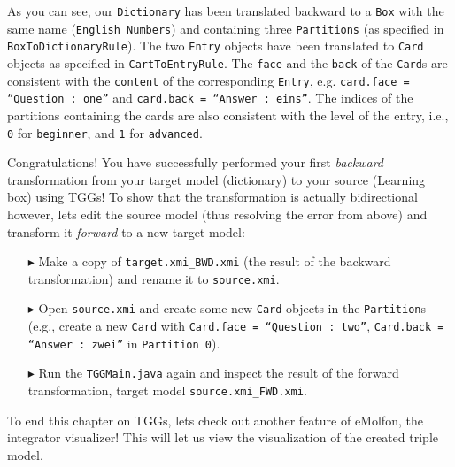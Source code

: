 As you can see, our \texttt{Dictionary} has been translated backward to a \texttt{Box} with the same name (\texttt{English Numbers}) and containing three
\texttt{Par\-ti\-tions} (as specified in \texttt{Box\-To\-Dictionary\-Rule}). The two \texttt{Entry} objects have been translated to \texttt{Card} objects as
specified in \texttt{CartToEntryRule}. The \texttt{face} and the \texttt{back} of the \texttt{Card}s are consistent with the \texttt{content}
of the corresponding \texttt{Entry}, e.g. \texttt{card.face = ``Question : one''} and \texttt{card.back = ``Answer : eins''}. The indices of the partitions
containing the cards are also consistent with the level of the entry, i.e., \texttt{0} for \texttt{beginner}, and \texttt{1} for \texttt{advanced}.

\vspace{0.5cm}

Congratulations! You have successfully performed your first \emph{backward} transformation from your target model (dictionary) to your source (Learning box)
using TGGs! To show that the transformation is actually bidirectional however, lets edit the source model (thus resolving the error from above) and transform it
\emph{forward} to a new target model:

\begin{itemize}
\item[$\blacktriangleright$] Make a copy of \texttt{target.xmi\_BWD.xmi} (the result of the backward transformation)
and rename it to \texttt{source.xmi}.
  
\item[$\blacktriangleright$] Open \texttt{source.xmi} and create some new \texttt{Card} objects in the \texttt{Partition}s (e.g., create a new \texttt{Card}
with \texttt{Card.face = ``Question : two''}, \texttt{Card.back = ``Answer : zwei''} in \texttt{Partition 0}).

\item[$\blacktriangleright$] Run the \texttt{TGGMain.java} again and inspect the result of the forward transformation, target model
\texttt{source.xmi\_FWD.xmi}.

\end{itemize}


To end this chapter on TGGs, lets check out another feature of eMolfon, the integrator visualizer! This will let us view the visualization of the created
triple model.

\newpage

